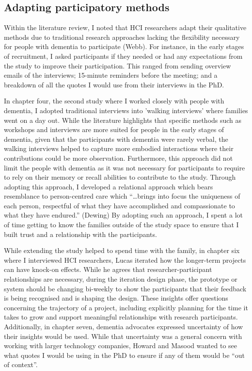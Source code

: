\subsection{Adapting participatory methods}
\label{AdoptingMethods}
Within the literature review, I noted that HCI researchers adapt their qualitative methods due to traditional research approaches lacking the flexibility necessary for people with dementia to participate (Webb). For instance, in the early stages of recruitment, I asked participants if they needed or had any expectations from the study to improve their participation. This ranged from sending overview emails of the interviews; 15-minute reminders before the meeting; and a breakdown of all the quotes I would use from their interviews in the PhD.

In chapter four, the second study where I worked closely with people with dementia, I adopted traditional interviews into 'walking interviews' where families went on a day out. While the literature highlights that specific methods such as workshops and interviews are more suited for people in the early stages of dementia, given that the participants with dementia were rarely verbal, the walking interviews helped to capture more embodied interactions where their contributions could be more observation. Furthermore, this approach did not limit the people with dementia as it was not necessary for participants to require to rely on their memory or recall abilities to contribute to the study. Through adopting this approach, I developed a relational approach which bears resemblance to person-centred care which “…brings into focus the uniqueness of each person, respectful of what they have accomplished and compassionate to what they have endured.” (Dewing) By adopting such an approach, I spent a lot of time getting to know the families outside of the study space to ensure that I built trust and a relationship with the participants. 

While extending the study helped to spend time with the family, in chapter six where I interviewed HCI researchers, Lucas iterated how the longer-term projects can have knock-on effects. While he agrees that researcher-participant relationships are necessary, during the iteration design phase, the prototype or system should be changing bi-weekly to show the participants that their feedback is being recognised and is shaping the design. These insights offer questions concerning the trajectory of a project, including explicitly planning for the time it takes to grow and support meaningful relationships with research participants. Additionally, in chapter seven, dementia advocates expressed uncertainty of how their insights would be used. While that uncertainty was a general concern with working with larger technology companies, Howard and Masood wanted to see what quotes I would be using in the PhD to ensure if any of them would be ``out of context''. 


